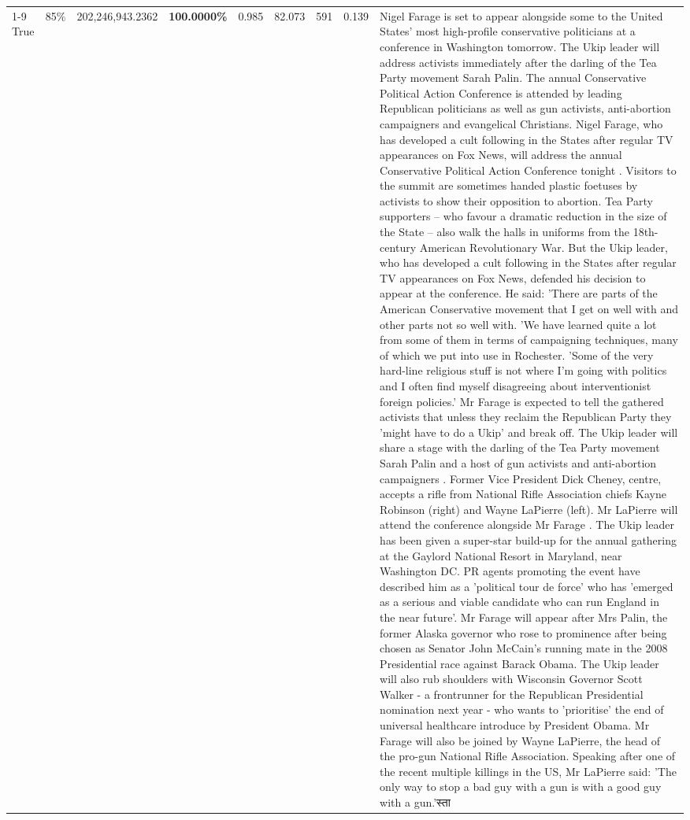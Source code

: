 \begin{table}[H]
\begin{tabular}{lllrlllll}
\cline{1-9} \cline{2-9}
True & 85\% & 202,246,943.2362 & \bfseries \color{red} 100.0000\% & 0.985 & 82.073 & 591 & 0.139 & Nigel Farage is set to appear alongside some to the United States' most high-profile conservative politicians at a conference in Washington tomorrow. The Ukip leader will address activists immediately after the darling of the Tea Party movement Sarah Palin. The annual Conservative Political Action Conference is attended by leading Republican politicians as well as gun activists, anti-abortion campaigners and evangelical Christians. Nigel Farage, who has developed a cult following in the States after regular TV appearances on Fox News, will address the annual Conservative Political Action Conference tonight . Visitors to the summit are sometimes handed plastic foetuses by activists to show their opposition to abortion. Tea Party supporters – who favour a dramatic reduction in the size of the State – also walk the halls in uniforms from the 18th-century American Revolutionary War. But the Ukip leader, who has developed a cult following in the States after regular TV appearances on Fox News, defended his decision to appear at the conference. He said: 'There are parts of the American Conservative movement that I get on well with and other parts not so well with. 'We have learned quite a lot from some of them in terms of campaigning techniques, many of which we put into use in Rochester. 'Some of the very hard-line religious stuff is not where I'm going with politics and I often find myself disagreeing about interventionist foreign policies.' Mr Farage is expected to tell the gathered activists that unless they reclaim the Republican Party they 'might have to do a Ukip' and break off. The Ukip leader will share a stage with the darling of the Tea Party movement Sarah Palin and a host of gun activists and anti-abortion campaigners . Former Vice President Dick Cheney, centre, accepts a rifle from National Rifle Association chiefs Kayne Robinson (right) and Wayne LaPierre (left). Mr LaPierre will attend the conference alongside Mr Farage . The Ukip leader has been given a super-star build-up for the annual gathering at the Gaylord National Resort in Maryland, near Washington DC. PR agents promoting the event have described him as a 'political tour de force' who has 'emerged as a serious and viable candidate who can run England in the near future'. Mr Farage will appear after Mrs Palin, the former Alaska governor who rose to prominence after being chosen as Senator John McCain's running mate in the 2008 Presidential race against Barack Obama. The Ukip leader will also rub shoulders with Wisconsin Governor Scott Walker - a frontrunner for the Republican Presidential nomination next year - who wants to 'prioritise' the end of universal healthcare introduce by President Obama. Mr Farage will also be joined by Wayne LaPierre, the head of the pro-gun National Rifle Association. Speaking after one of the recent multiple killings in the US, Mr LaPierre said: 'The only way to stop a bad guy with a gun is with a good guy with a gun.'स्ता \\

\end{tabular}
\end{table}
